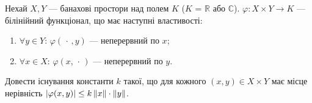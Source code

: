 \begin{exercise}
    Нехай $X, Y$ --- банахові простори над полем $K$ ($K$ = $\mathbb{R}$ або $\mathbb{C}$).
    $\varphi: X \times Y \rightarrow K$ --- білінійний функціонал, що має наступні властивості:
    \begin{enumerate}[label=\ukr*)]
        \item $\forall y \in Y$: $\varphi(\,\cdot\,, y)$ --- неперервний по $x$;
        \item $\forall x \in X$: $\varphi(x, \,\cdot\,)$ --- неперервний по $y$.
    \end{enumerate}
    Довести існування константи $k$ такої, що для кожного $(x,y) \in X \times Y$ має місце нерівність
    $|\varphi(x,y)| \leq k \left\lVert x\right\rVert\cdot\left\lVert y\right\rVert$.
\end{exercise}